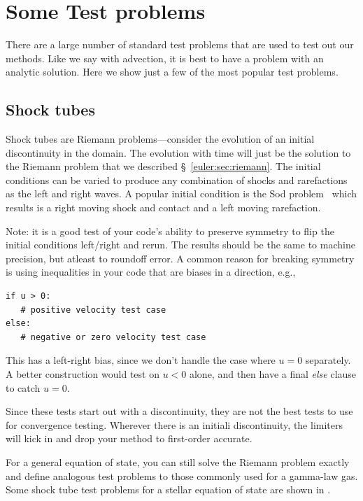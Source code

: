 \section{Some Test problems}

There are a large number of standard test problems that are used to
test out our methods.  Like we say with advection, it is best to have
a problem with an analytic solution.  Here we show just a few of the most
popular test problems.

\subsection{Shock tubes}
\label{sec:euler-methods:shocktubes}

Shock tubes are Riemann problems---consider the evolution of an
initial discontinuity in the domain.  The evolution with time will
just be the solution to the Riemann problem that we described
\S~\ref{euler:sec:riemann}.  The initial conditions can be varied to
produce any combination of shocks and rarefactions as the left and
right waves.  A popular initial condition is the Sod
problem~\cite{sod:1978} which results is a right moving shock and
contact and a left moving rarefaction.

Note: it is a good test of your code's ability to preserve symmetry to
flip the initial conditions left/right and rerun.  The results should
be the same to machine precision, but atleast to roundoff error.  A
common reason for breaking symmetry is using inequalities in your code
that are biases in a direction, e.g.,
\begin{lstlisting}
if u > 0:
   # positive velocity test case
else:
   # negative or zero velocity test case
\end{lstlisting}
This has a left-right bias, since we don't handle the case where $u =
0$ separately.  A better construction would test on $u < 0$ alone, and
then have a final {\em else} clause to catch $u = 0$.

Since these tests start out with a discontinuity, they are not the
best tests to use for convergence testing.  Wherever there is an
initiali discontinuity, the limiters will kick in and drop your
method to first-order accurate.

For a general equation of state, you can still solve the Riemann
problem exactly and define analogous test problems to those commonly
used for a gamma-law gas.  Some shock tube test problems for a stellar
equation of state are shown in \cite{zingalekatz}.

